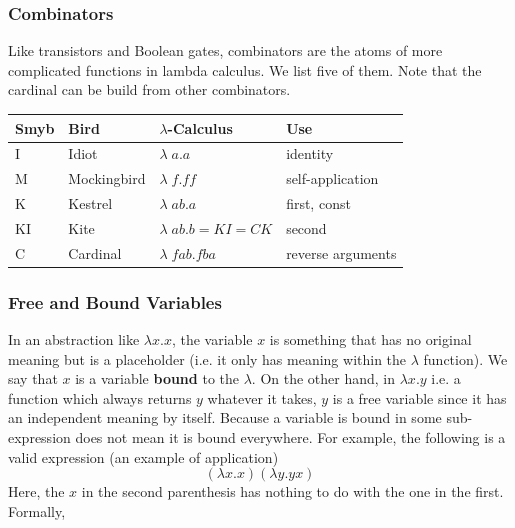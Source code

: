   \subsubsection{Combinators}
  Like transistors and Boolean gates, combinators are the atoms of more complicated functions in lambda calculus. We list five of them. Note that the cardinal can be build from other combinators. 
  \begin{center}
      \begin{tabular}{l|l|l|l}
      Smyb & Bird & $\lambda$-Calculus & Use \\
      \hline
      I & Idiot & $\lambda\;a.a$ & identity \\
      M & Mockingbird & $\lambda\;f.ff$ & self-application \\
      K & Kestrel & $\lambda\;ab.a $ & first, const \\
      KI & Kite & $\lambda\;ab.b = KI = CK$ & second \\
      C & Cardinal & $\lambda\;fab.fba$ & reverse arguments
  \end{tabular}
  \end{center}


  \subsubsection{Free and Bound Variables}
  In an abstraction like $\lambda x . x$, the variable $x$ is something that has no original meaning but is a placeholder (i.e. it only has meaning within the $\lambda$ function). We say that $x$ is a variable \textbf{bound} to the $\lambda$. On the other hand, in $\lambda x . y$ i.e. a function which always returns $y$ whatever it takes, $y$ is a free variable since it has an independent meaning by itself. Because a variable is bound in some sub-expression does not mean it is bound everywhere. For example, the following is a valid expression (an example of application)
  \begin{equation}
    (\lambda x . x) ( \lambda y. y x)
  \end{equation}
  Here, the $x$ in the second parenthesis has nothing to do with the one in the first. Formally, 

